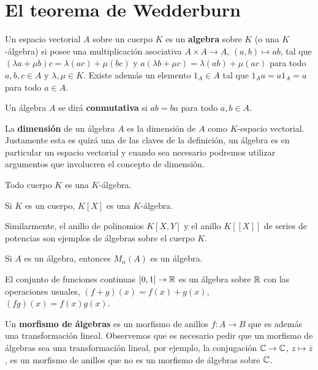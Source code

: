 \chapter{El teorema de Wedderburn}

	Un espacio vectorial $A$ sobre un cuerpo $K$ es un \textbf{algebra} sobre $K$
	(o una $K$-álgebra) si posee una multiplicación asociativa $A\times A\to A$,
	$(a,b)\mapsto ab$, tal que
	$(\lambda a+\mu b)c=\lambda(ac)+\mu(bc)$ y 
	$a(\lambda b+\mu c)=\lambda(ab)+\mu(ac)$ 
	para todo $a,b,c\in A$ y $\lambda,\mu\in K$. Existe además un 
	elemento $1_A\in A$ tal que $1_Aa=a1_A=a$
	para todo $a\in A$.

Un álgebra $A$ se dirá \textbf{conmutativa} si $ab=ba$ para todo $a,b\in A$. 

La \textbf{dimensión} de un álgebra $A$ es la dimensión de $A$ como $K$-espacio
vectorial. Justamente esta es quizá una de las claves de la definición, 
un álgebra es en particular un espacio vectorial y cuando sea necesario podremos 
utilizar argumentos que involucren el concepto de dimensión. 

\begin{example}
	Todo cuerpo $K$ es una $K$-álgebra. 
\end{example}

\begin{example}
	Si $K$ es un cuerpo, $K[X]$ es una $K$-álgebra. 
\end{example}

Similarmente, el anillo de polinomios $K[X,Y]$ y el anillo $K[[X]]$ de series de potencias son ejemplos de álgebras sobre el cuerpo $K$. 

\begin{example}
	Si $A$ es un álgebra, entonces $M_n(A)$ es un álgebra. 
\end{example}

\begin{example}
El conjunto de funciones continuas $[0,1]\to\mathbb{R}$ es un álgebra sobre $\mathbb{R}$ con las operaciones usuales, $(f+g)(x)=f(x)+g(x)$, $(fg)(x)=f(x)g(x)$. 
\end{example}

Un \textbf{morfismo de álgebras} es un morfismo de anillos $f\colon A\to B$ que es además una transformación lineal. Observemos 
que es necesario pedir que un morfismo de álgebras sea una transformación lineal, por ejemplo, la conjugación 
$\mathbb{C}\to \mathbb{C}$, $z\mapsto\overline{z}$, es un morfismo de anillos que no es un morfismo de álgebras sobre $\mathbb{C}$. 

